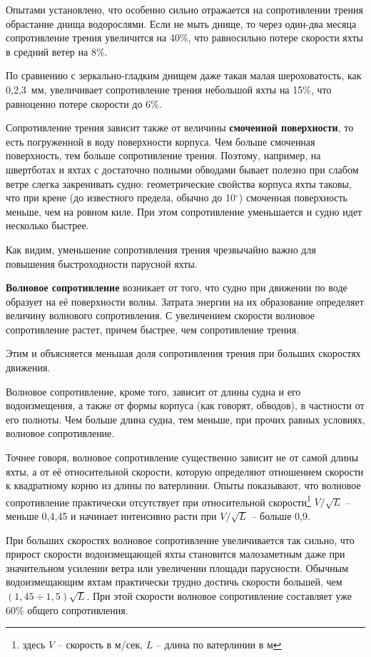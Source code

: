 \documentclass[a4paper, 12pt, twoside, final]{scrbook}
\begin{document}
Опытами установлено, что особенно сильно отражается на сопротивлении трения обрастание днища водорослями. Если не мыть днище, то через один-два месяца сопротивление трения увеличится на 40\%, что равносильно потере скорости яхты в средний ветер на 8\%.

По сравнению с зеркально-гладким днищем даже такая малая шероховатость, как 0,2,3~мм, увеличивает сопротивление трения небольшой яхты на 15\%, что равноценно потере скорости до 6\%.

Сопротивление трения зависит также от величины \textbf{смоченной поверхности}, то есть погруженной в воду поверхности корпуса. Чем больше смоченная поверхность, тем больше сопротивление трения. Поэтому, например, на швертботах и яхтах с достаточно полными обводами бывает полезно при слабом ветре слегка закренивать судно: геометрические свойства корпуса яхты таковы, что при крене (до известного предела, обычно до 10$^\circ$) смоченная поверхность меньше, чем на ровном киле. При этом сопротивление уменьшается и судно идет несколько быстрее.

Как видим, уменьшение сопротивления трения чрезвычайно важно для повышения быстроходности парусной яхты.

\textbf{Волновое сопротивление} возникает от того, что судно при движении по воде образует на её поверхности волны. Затрата энергии на их образование определяет величину волнового сопротивления. С увеличением скорости волновое сопротивление растет, причем быстрее, чем сопротивление трения.

Этим и объясняется меньшая доля сопротивления трения при больших скоростях движения.

Волновое сопротивление, кроме того, зависит от длины судна и его водоизмещения, а также от формы корпуса (как говорят, обводов), в частности от его полноты. Чем больше длина судна, тем меньше, при прочих равных условиях, волновое сопротивление.

Точнее говоря, волновое сопротивление существенно зависит не от самой длины яхты, а от её относительной скорости, которую определяют отношением скорости к квадратному корню из длины по ватерлинии. Опыты показывают, что волновое сопротивление практически отсутствует при относительной скорости\footnote{здесь $V$ \--- скорость в м/сек, $L$ \--- длина по ватерлинии в м} $V/\sqrt{L}$ \--- меньше 0,4,45 и начинает интенсивно расти при $V/\sqrt{L}$ \--- больше 0,9.

При больших скоростях волновое сопротивление увеличивается так сильно, что прирост скорости водоизмещающей яхты становится малозаметным даже при значительном усилении ветра или увеличении площади парусности. Обычным водоизмещающим яхтам практически трудно достичь скорости большей, чем $(1{,}45\div1{,}5)\sqrt{L}$. При этой скорости волновое сопротивление составляет уже 60\% общего сопротивления.
\end{document}
